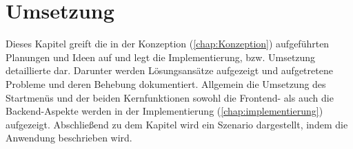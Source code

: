 

\chapter{Umsetzung}
\label{chap:Umsetzung}
Dieses Kapitel greift die in der Konzeption (\ref{chap:Konzeption}) aufgeführten Planungen und Ideen auf und legt die Implementierung, bzw. 
Umsetzung detaillierte dar. Darunter werden Lösungsansätze aufgezeigt und aufgetretene Probleme und deren Behebung dokumentiert. Allgemein die Umsetzung 
des Startmenüs und der beiden Kernfunktionen sowohl die Frontend- als auch die Backend-Aspekte werden in der Implementierung (\ref{chap:implementierung}) 
aufgezeigt. Abschließend zu dem Kapitel wird ein Szenario dargestellt, indem die Anwendung beschrieben wird.

